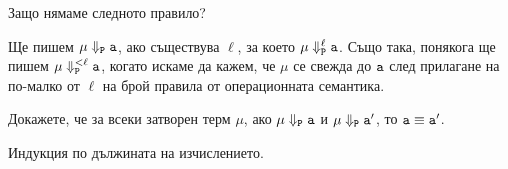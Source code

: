 \begin{description}
  \begin{figure}[h!]
    \begin{prooftree}
    \end{prooftree}
  \end{figure}
\item
  \begin{figure}[h!]
    \begin{prooftree}
    \end{prooftree}
  \end{figure}
\end{description}

\begin{remark}
  Защо нямаме следното правило?
  \begin{figure}[h!]
    \begin{prooftree}
    \end{prooftree}
  \end{figure}
\end{remark}

Ще пишем $\mu \Downarrow_{\vv{P}} \vv{a}$, ако съществува $\ell$, за което $\mu \opsemFun{\ell} \vv{a}$.
Също така, понякога ще пишем $\mu \opsemFun{<\ell} \vv{a}$, когато искаме да кажем, че
$\mu$ се свежда до $\vv{a}$ след прилагане на по-малко от $\ell$ на брой правила от операционната семантика.

\begin{lemma}
  Докажете, че за всеки затворен терм $\mu$,
  ако $\mu \Downarrow_{\vv{P}} \vv{a}$ и $\mu \Downarrow_{\vv{P}} \vv{a}'$, то $\vv{a} \equiv \vv{a}'$.
\end{lemma}
\begin{hint}
  Индукция по дължината на изчислението.
\end{hint}

